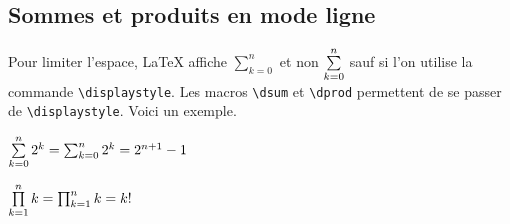 \documentclass[12pt,a4paper]{article}
\begin{document}

\subsection{Sommes et produits en mode ligne}

Pour limiter l'espace, \LaTeX{} affiche $\sum_{k=0}^{n}$ et non $\sum\limits_{k=0}^{n}$ sauf si l'on utilise la commande \verb+\displaystyle+.
Les macros \verb+\dsum+ et \verb+\dprod+ permettent de se passer de \verb+\displaystyle+.
Voici un exemple.


\begin{tcblisting}{}
$\dsum_{k=0}^{n} 2^k = \sum_{k=0}^{n} 2^k = 2^{n+1} - 1$

$\dprod_{k=1}^{n} k = \prod_{k=1}^{n} k = k !$
\end{tcblisting}
\end{document}
